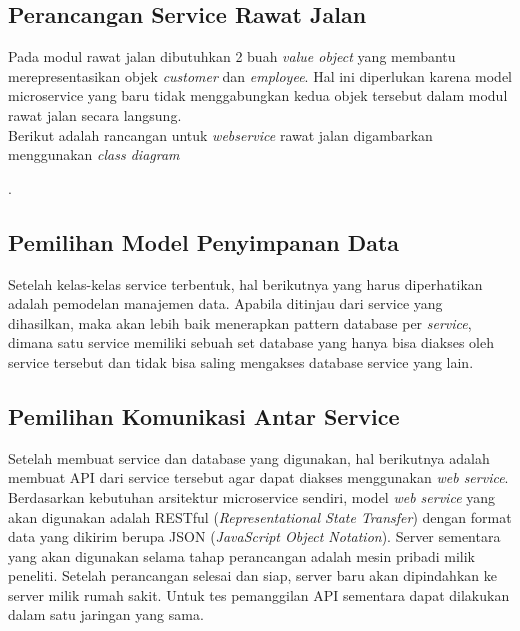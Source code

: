 \subsection{Perancangan Service Rawat Jalan}
Pada modul rawat jalan dibutuhkan 2 buah \textit{value object} yang membantu merepresentasikan objek \textit{customer} dan \textit{employee}. Hal ini diperlukan karena model microservice yang baru tidak menggabungkan kedua objek tersebut dalam modul rawat jalan secara langsung.\\
Berikut adalah rancangan untuk \textit{webservice} rawat jalan digambarkan menggunakan \textit{class diagram}

\begin{adjustbox}{width=1\textwidth}
	\begin{minipage}{\linewidth}
		.
	\end{minipage}
\end{adjustbox}

\subsection{Pemilihan Model Penyimpanan Data}
Setelah kelas-kelas service terbentuk, hal berikutnya yang harus diperhatikan adalah pemodelan manajemen data. Apabila ditinjau dari service yang dihasilkan, maka akan lebih baik menerapkan pattern database per \textit{service}, dimana satu service memiliki sebuah set database yang hanya bisa diakses oleh service tersebut dan tidak bisa saling mengakses database service yang lain.
\subsection{Pemilihan Komunikasi Antar Service}
Setelah membuat service dan database yang digunakan, hal berikutnya adalah membuat API dari service tersebut agar dapat diakses menggunakan \textit{web service}. Berdasarkan kebutuhan arsitektur microservice sendiri, model \textit{web service} yang akan digunakan adalah RESTful (\textit{Representational State Transfer}) dengan format data yang dikirim berupa JSON (\textit{JavaScript Object Notation}). Server sementara yang akan digunakan selama tahap perancangan adalah mesin pribadi milik peneliti. Setelah perancangan selesai dan siap, server baru akan dipindahkan ke server milik rumah sakit. Untuk tes pemanggilan API sementara dapat dilakukan dalam satu jaringan yang sama.

